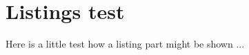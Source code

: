 \chapter{Listings test}

Here is a little test how a listing part might be shown ...

\lstset{style=listingstyle}

